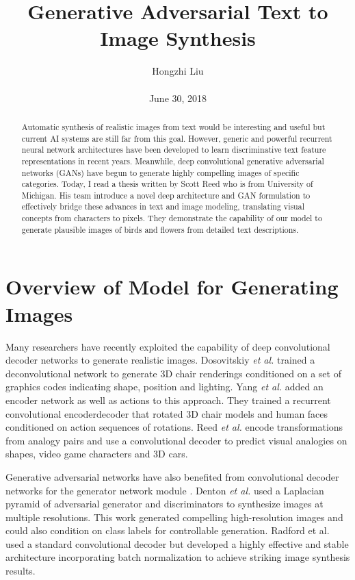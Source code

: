 \documentclass[10pt,twocolumn,letterpaper]{article}
\title{Generative Adversarial Text to Image Synthesis}
\author{Hongzhi Liu\\\\
June 30, 2018}
\begin{document}
\maketitle
\begin{abstract}
	Automatic synthesis of realistic images from text would be interesting and useful but current AI systems are still far from this goal. However, generic and powerful recurrent neural network architectures have been developed to learn discriminative text feature representations in recent years. Meanwhile, deep convolutional generative adversarial networks (GANs) have begun to generate highly compelling images of specific categories. Today, I read a thesis written by Scott Reed who is from University of Michigan. His team introduce a novel deep architecture and GAN formulation to effectively bridge these advances in text and image modeling, translating visual concepts from characters to pixels. They demonstrate the capability of our model to generate plausible images of birds and flowers from detailed text descriptions.
\end{abstract}
\section{Overview of Model for Generating Images}

Many researchers have recently exploited the capability of deep convolutional decoder networks to generate realistic images. Dosovitskiy \emph{et al.} \cite{Dosovitskiy2015Learning} trained a deconvolutional network to generate 3D chair renderings conditioned on a set of graphics codes indicating shape, position and lighting. Yang \emph{et al.} \cite{Yang2015Weakly} added an encoder network as well as actions to this approach. They trained a recurrent convolutional encoderdecoder that rotated 3D chair models and human faces conditioned on action sequences of rotations. Reed \emph{et al.} \cite{Reed2015Deep} encode transformations from analogy pairs and use a convolutional decoder to predict visual analogies on shapes, video game characters and 3D cars.

Generative adversarial networks have also benefited from convolutional decoder networks for the generator network module \cite{Goodfellow2014Generative}. Denton \emph{et al.} \cite{denton2015deep} used a Laplacian pyramid of adversarial generator and discriminators to synthesize images at multiple resolutions. This work generated compelling high-resolution images and could also condition on class labels for controllable generation. Radford et al. \cite{radford2015unsupervised} used a standard convolutional decoder but developed a highly effective and stable architecture incorporating batch normalization to achieve striking image synthesis results.
\end{document}
